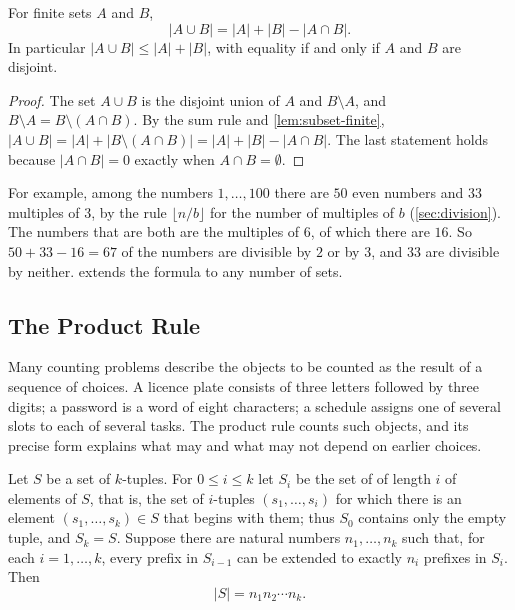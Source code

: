 \begin{proposition}
\label{prop:union-two}
For finite sets $A$ and $B$,
\[
|A\cup B|=|A|+|B|-|A\cap B| .
\]
In particular $|A\cup B|\le|A|+|B|$, with equality if and only if $A$ and $B$ are disjoint.
\end{proposition}

\begin{proof}
The set $A\cup B$ is the disjoint union of $A$ and $B\setminus A$, and $B\setminus A=B\setminus(A\cap B)$. By the sum rule and \cref{lem:subset-finite}, $|A\cup B|=|A|+|B\setminus(A\cap B)|=|A|+|B|-|A\cap B|$. The last statement holds because $|A\cap B|=0$ exactly when $A\cap B=\emptyset$.
\end{proof}

For example, among the numbers $1,\ldots,100$ there are $50$ even numbers and $33$ multiples of $3$, by the rule $\lfloor n/b\rfloor$ for the number of multiples of $b$ (\cref{sec:division}). The numbers that are both are the multiples of $6$, of which there are $16$. So $50+33-16=67$ of the numbers are divisible by $2$ or by $3$, and $33$ are divisible by neither.  extends the formula to any number of sets.

\subsection{The Product Rule}

Many counting problems describe the objects to be counted as the result of a sequence of choices. A licence plate consists of three letters followed by three digits; a password is a word of eight characters; a schedule assigns one of several slots to each of several tasks. The product rule counts such objects, and its precise form explains what may and what may not depend on earlier choices.

\begin{theorem}
\label{thm:product-rule}
Let $S$ be a set of $k$-tuples. For $0\le i\le k$ let $S_i$ be the set of  of length $i$ of elements of $S$, that is, the set of $i$-tuples $(s_1,\ldots,s_i)$ for which there is an element $(s_1,\ldots,s_k)\in S$ that begins with them; thus $S_0$ contains only the empty tuple, and $S_k=S$. Suppose there are natural numbers $n_1,\ldots,n_k$ such that, for each $i=1,\ldots,k$, every prefix in $S_{i-1}$ can be extended to exactly $n_i$ prefixes in $S_i$. Then
\[
|S|=n_1n_2\cdots n_k .
\]
\end{theorem}

